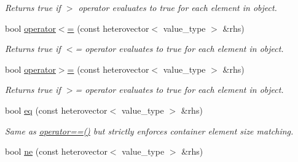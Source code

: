 \begin{DoxyCompactItemize}
\begin{DoxyCompactList}\small\item\em Returns true if $>$ operator evaluates to true for each element in object. \end{DoxyCompactList}\item 
\hypertarget{classheterogeneous_1_1heterovector_3_01_t_01_4_a3288bba9a9e8b716fe532ec4dabefd99}{}bool \hyperlink{classheterogeneous_1_1heterovector_3_01_t_01_4_a3288bba9a9e8b716fe532ec4dabefd99}{operator$<$=} (const heterovector$<$ value\+\_\+type $>$ \&rhs)\label{classheterogeneous_1_1heterovector_3_01_t_01_4_a3288bba9a9e8b716fe532ec4dabefd99}

\begin{DoxyCompactList}\small\item\em Returns true if $<$= operator evaluates to true for each element in object. \end{DoxyCompactList}\item 
\hypertarget{classheterogeneous_1_1heterovector_3_01_t_01_4_abda9244ae3f7598d912dd2b81e0f369a}{}bool \hyperlink{classheterogeneous_1_1heterovector_3_01_t_01_4_abda9244ae3f7598d912dd2b81e0f369a}{operator$>$=} (const heterovector$<$ value\+\_\+type $>$ \&rhs)\label{classheterogeneous_1_1heterovector_3_01_t_01_4_abda9244ae3f7598d912dd2b81e0f369a}

\begin{DoxyCompactList}\small\item\em Returns true if $>$= operator evaluates to true for each element in object. \end{DoxyCompactList}\item 
\hypertarget{classheterogeneous_1_1heterovector_3_01_t_01_4_a16871d1e96c2460062002af02e265c4a}{}bool \hyperlink{classheterogeneous_1_1heterovector_3_01_t_01_4_a16871d1e96c2460062002af02e265c4a}{eq} (const heterovector$<$ value\+\_\+type $>$ \&rhs)\label{classheterogeneous_1_1heterovector_3_01_t_01_4_a16871d1e96c2460062002af02e265c4a}

\begin{DoxyCompactList}\small\item\em Same as \hyperlink{classheterogeneous_1_1heterovector_3_01_t_01_4_ad2411d5a7b4bc24cfd74c9385dc31ec3}{operator==()} but strictly enforces container element size matching. \end{DoxyCompactList}\item 
\hypertarget{classheterogeneous_1_1heterovector_3_01_t_01_4_a6354b795e69a4605cdfb5f55ec59ddd2}{}bool \hyperlink{classheterogeneous_1_1heterovector_3_01_t_01_4_a6354b795e69a4605cdfb5f55ec59ddd2}{ne} (const heterovector$<$ value\+\_\+type $>$ \&rhs)\label{classheterogeneous_1_1heterovector_3_01_t_01_4_a6354b795e69a4605cdfb5f55ec59ddd2}


\end{DoxyCompactItemize}
